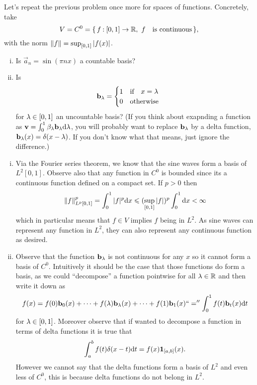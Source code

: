 \documentclass[12pt]{memoir}
\begin{document}
\begin{Ej}
    Let's repeat the previous problem once more for spaces of
functions. Concretely, take
$$V=C^0=\{\,f\mathbin{:}[0,1]\to \mathbb{R},\ f\quad\text{is continuous}\,\},$$
with the norm $\norm{f}=\sup_{\left\lbrack0,1\right\rbrack}|f(x)|$.
\begin{enumerate}[i)]
    \item Is $\vec a_n=\sin(\pi n x)$ a countable basis?
    \item Is 
    $$\mathbf{b}_\lambda=\begin{cases}
        1\quad\text{if}\quad x=\lambda\\
        0\quad\text{otherwise}\quad
    \end{cases}$$
    for $\lambda\in\left\lbrack0,1\right\rbrack$ an uncountable basis? (If you think about exapnding a function as $\mathbf{v}=\int_0^1\beta_\lambda\mathbf{b}_\lambda\dd\lambda$, you will probably want to replace $\mathbf{b}_\lambda$ by a delta function, $\mathbf{b}_\lambda(x)=\delta(x-\lambda)$. If you don't know what that means, just ignore the difference.)
\end{enumerate}
\end{Ej}

\begin{ptcbr}
    \begin{enumerate}[i)]
        \item Via the Fourier series theorem, we know that the sine waves form a basis of $L^2[0,1]$. Observe also that any function in $C^0$ is bounded since its a continuous function defined on a compact set. If $p>0$ then 
        $$\norm{f}_{L^p[0,1]}^p=\int_0^1|f|^p\dd x\leqslant(\sup_{[0,1]}|f|)^p\int_0^1\dd x<\infty$$
        which in particular means that $f\in V$ implies $f$ being in $L^2$. As sine waves can represent any function in $L^2$, they can also represent any continuous function as desired.  
        \item Observe that the function $\mathbf{b}_\lambda$ is not continuous for any $x$ so it cannot form a basis of $C^0$. Intuitively it should be the case that those functions do form a basis, as we could ``decompose'' a function pointwise for all $\lambda\in\mathbb{R}$ and then write it down as 
        $$f(x)=f(0)\mathbf{b}_0(x)+\dots+f(\lambda)\mathbf{b}_\lambda(x)+\dots+f(1)\mathbf{b}_1(x)``=''\int_0^1f(t)\mathbf{b}_t(x)\dd t$$
        for $\lambda\in\left\lbrack0,1\right\rbrack$. Moreover observe that if wanted to decompose a function in terms of delta functions it is true that 
        $$\int_a^b f(t)\delta(x-t)\dd t=f(x)\mathbf{1}_{\left\lbrack a,b\right\rbrack}(x).$$
        However we cannot say that the delta functions form a basis of $L^2$ and even less of $C^0$, this is because delta functions do not belong in $L^2$. 
    \end{enumerate}
\end{ptcbr}
\end{document}

